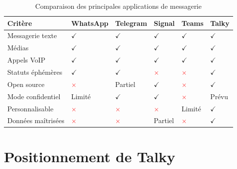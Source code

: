 \documentclass[12pt,a4paper]{report}
\begin{document}
\begin{table}[H]
\centering
\caption{Comparaison des principales applications de messagerie}
\label{tab:comparaison}
\renewcommand{\arraystretch}{1.35}
\begin{tabularx}{\textwidth}{@{}lXXXXX@{}}
\toprule
\textbf{Critère} & \textbf{WhatsApp} & \textbf{Telegram}
  & \textbf{Signal} & \textbf{Teams} & \textbf{Talky}\\\midrule
Messagerie texte   & \textcolor{TalkyGreen}{$\checkmark$} & \textcolor{TalkyGreen}{$\checkmark$} & \textcolor{TalkyGreen}{$\checkmark$} & \textcolor{TalkyGreen}{$\checkmark$} & \textcolor{TalkyGreen}{$\checkmark$}\\
Médias             & \textcolor{TalkyGreen}{$\checkmark$} & \textcolor{TalkyGreen}{$\checkmark$} & \textcolor{TalkyGreen}{$\checkmark$} & \textcolor{TalkyGreen}{$\checkmark$} & \textcolor{TalkyGreen}{$\checkmark$}\\
Appels VoIP        & \textcolor{TalkyGreen}{$\checkmark$} & \textcolor{TalkyGreen}{$\checkmark$} & \textcolor{TalkyGreen}{$\checkmark$} & \textcolor{TalkyGreen}{$\checkmark$} & \textcolor{TalkyGreen}{$\checkmark$}\\
Statuts éphémères  & \textcolor{TalkyGreen}{$\checkmark$} & \textcolor{TalkyGreen}{$\checkmark$} & \textcolor{red}{$\times$} & \textcolor{red}{$\times$} & \textcolor{TalkyGreen}{$\checkmark$}\\
Open source        & \textcolor{red}{$\times$} & Partiel & \textcolor{TalkyGreen}{$\checkmark$} & \textcolor{red}{$\times$} & \textcolor{TalkyGreen}{$\checkmark$}\\
Mode confidentiel  & Limité & \textcolor{TalkyGreen}{$\checkmark$} & \textcolor{TalkyGreen}{$\checkmark$} & \textcolor{red}{$\times$} & Prévu\\
Personnalisable    & \textcolor{red}{$\times$} & \textcolor{red}{$\times$} & \textcolor{red}{$\times$} & Limité & \textcolor{TalkyGreen}{$\checkmark$}\\
Données maîtrisées & \textcolor{red}{$\times$} & \textcolor{red}{$\times$} & Partiel & \textcolor{red}{$\times$} & \textcolor{TalkyGreen}{$\checkmark$}\\
\bottomrule
\end{tabularx}
\end{table}

\section{Positionnement de Talky}
\end{document}
